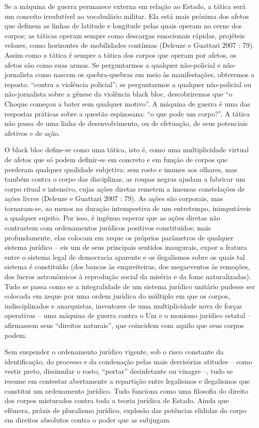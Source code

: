 Se a máquina de guerra permanece externa em relação ao Estado, a tática
será um conceito irredutível ao vocabulário militar. Ela está mais
próxima dos afetos que definem as linhas de latitude e longitude pelas
quais operam no cerne dos corpos; as táticas operam sempre como
descargas emocionais rápidas, projéteis velozes, como horizontes de
mobilidades contínuas (Deleuze e Guattari 2007 : 79). Assim como a
tática é sempre a tática dos corpos que operam por afetos, os afetos são
como suas armas. Se perguntarmos a qualquer não-policial e
não-jornalista como nascem os quebra-quebras em meio às manifestações,
obteremos a reposta: ``contra a violência policial''; se perguntarmos a
qualquer não-policial ou não-jornalista sobre a gênese da violência
black bloc, descobriremos que ``o Choque começou a bater sem qualquer
motivo''. A máquina de guerra é uma das respostas práticas sobre a
questão espinosana: ``o que pode um corpo?''. A tática não passa de uma
linha de desenvolvimento, ou de efetuação, de seus potenciais afetivos e
de ação.

O black bloc define-se como uma tática, isto é, como uma multiplicidade
virtual de afetos que só podem definir-se em concreto e em função de
corpos que perderam qualquer qualidade subjetiva: sem rosto e imunes aos
olhares, mas também contra o corpo das disciplinas, as roupas negras
ajudam a fabricar um corpo ritual e intensivo, cujas ações diretas
remetem a imensas constelações de ações livres (Deleuze e Guattari 2007
: 79). As ações são corporais, mas tornaram-se, ao menos na duração
intempestiva de um entretempo, inimputáveis a qualquer sujeito. Por
isso, é ingênuo esperar que as ações diretas não contrastem com
ordenamentos jurídicos positivos constituídos; mais profundamente, elas
colocam em xeque os próprios parâmetros de qualquer sistema jurídico --
eis um de seus principais sentidos inaugurais, expor a fratura entre o
sistema legal de democracia aparente e os ilegalismos sobre os quais tal
sistema é constituído (dos bancos às empreiteiras, dos megaeventos às
remoções, dos lucros astronômicos à reprodução social da miséria e da
fome naturalizadas). Tudo se passa como se a integralidade de um sistema
jurídico unitário pudesse ser colocada em xeque por uma ordem jurídica
do múltiplo em que os corpos, indisciplinados e anarquistas, inventores
de uma multiplicidade nova de forças operativas -- uma máquina de guerra
contra o Um e o monismo jurídico estatal -- afirmassem seus ``direitos
naturais'', que coincidem com aquilo que seus corpos podem.

Sem suspender o ordenamento jurídico vigente, sob o risco constante da
identificação, do processo e da condenação pelas mais derrisórias
atitudes -- como vestir preto, dissimular o rosto, ``portar''
desinfetante ou vinagre --, tudo se resume em contestar abertamente a
repartição entre legalismos e ilegalismos que constitui um ordenamento
jurídico. Tudo funciona como uma filosofia do direito dos corpos
misturados contra toda a teoria jurídica de Estado. Ainda que efêmera,
práxis de pluralismo jurídico, explosão das potências elididas do corpo
em direitos absolutos contra o poder que as subjugam.


